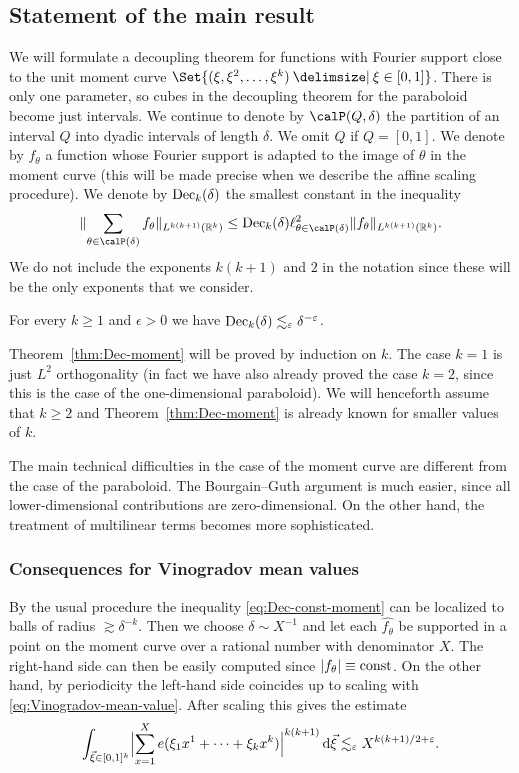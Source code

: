 \subsection{Statement of the main result}
We will formulate a decoupling theorem for functions with Fourier support close to the unit moment curve $\Set{(\xi,\xi^{2},\dotsc,\xi^{k}) \given \xi \in [0,1]}$.
There is only one parameter, so cubes in the decoupling theorem for the paraboloid become just intervals.
We continue to denote by $\Part[Q]{\delta}$ the partition of an interval $Q$ into dyadic intervals of length $\delta$.
We omit $Q$ if $Q=[0,1]$.
We denote by $f_{\theta}$ a function whose Fourier support is adapted to the image of $\theta$ in the moment curve (this will be made precise when we describe the affine scaling procedure).
We denote by $\Dec_{k}(\delta)$ the smallest constant in the inequality
\begin{equation}
\label{eq:Dec-const-moment}
\norm{ \sum_{\theta \in \Part{\delta}} f_{\theta} }_{L^{k(k+1)}(\R^{k})} \leq \Dec_{k}(\delta) \ell^{2}_{\theta \in \Part{\delta}} \norm{ f_{\theta} }_{L^{k(k+1)}(\R^{k})}.
\end{equation}
We do not include the exponents $k(k+1)$ and $2$ in the notation since these will be the only exponents that we consider.
\begin{theorem}
\label{thm:Dec-moment}
For every $k\geq 1$ and $\epsilon>0$ we have $\Dec_{k}(\delta) \lesssim_{\epsilon} \delta^{-\epsilon}$.
\end{theorem}
Theorem~\ref{thm:Dec-moment} will be proved by induction on $k$.
The case $k=1$ is just $L^{2}$ orthogonality (in fact we have also already proved the case $k=2$, since this is the case of the one-dimensional paraboloid).
We will henceforth assume that $k\geq 2$ and Theorem~\ref{thm:Dec-moment} is already known for smaller values of $k$.

The main technical difficulties in the case of the moment curve are different from the case of the paraboloid.
The Bourgain--Guth argument is much easier, since all lower-dimensional contributions are zero-dimensional.
On the other hand, the treatment of multilinear terms becomes more sophisticated.

\subsubsection{Consequences for Vinogradov mean values}
By the usual procedure the inequality \eqref{eq:Dec-const-moment} can be localized to balls of radius $\gtrsim \delta^{-k}$.
Then we choose $\delta \sim X^{-1}$ and let each $\widehat{f_{\theta}}$ be supported in a point on the moment curve over a rational number with denominator $X$.
The right-hand side can then be easily computed since $\abs{f_{\theta}} \equiv \const$.
On the other hand, by periodicity the left-hand side coincides up to scaling with \eqref{eq:Vinogradov-mean-value}.
After scaling this gives the estimate
\[
\int_{\vec\xi \in [0,1]^{k}} \abs[\Big]{ \sum_{x=1}^{X} e(\xi_{1} x^{1} + \dotsb + \xi_{k}x^{k} ) }^{k(k+1)} \dif\vec\xi
\lesssim_{\epsilon}
X^{k(k+1)/2+\epsilon}.
\]

